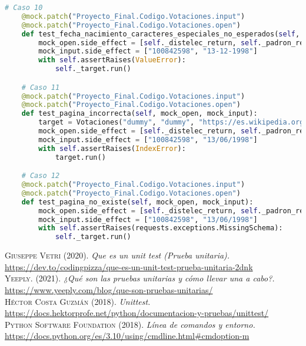 \documentclass[conference]{IEEEtran}
\begin{document}
\begin{lstlisting}[language=Python, basicstyle=\tiny, breaklines=true,
    postbreak=\mbox{\textcolor{red}{$\hookrightarrow$}\space}]
    # Caso 10
    @mock.patch("Proyecto_Final.Codigo.Votaciones.input")
    @mock.patch("Proyecto_Final.Codigo.Votaciones.open")
    def test_fecha_nacimiento_caracteres_especiales_no_esperados(self, mock_open, mock_input):
        mock_open.side_effect = [self._distelec_return, self._padron_return]
        mock_input.side_effect = ["100842598", "13-12-1998"]
        with self.assertRaises(ValueError):
            self._target.run()

    # Caso 11
    @mock.patch("Proyecto_Final.Codigo.Votaciones.input")
    @mock.patch("Proyecto_Final.Codigo.Votaciones.open")
    def test_pagina_incorrecta(self, mock_open, mock_input):
        target = Votaciones("dummy", "dummy", "https://es.wikipedia.org/wiki/Elecciones_generales_de_Costa_Rica_de_3022")
        mock_open.side_effect = [self._distelec_return, self._padron_return]
        mock_input.side_effect = ["100842598", "13/06/1998"]
        with self.assertRaises(IndexError):
            target.run()

    # Caso 12
    @mock.patch("Proyecto_Final.Codigo.Votaciones.input")
    @mock.patch("Proyecto_Final.Codigo.Votaciones.open")
    def test_pagina_no_existe(self, mock_open, mock_input):
        mock_open.side_effect = [self._distelec_return, self._padron_return]
        mock_input.side_effect = ["100842598", "13/06/1998"]
        with self.assertRaises(requests.exceptions.MissingSchema):
            self._target.run()

\end{lstlisting}







\normalsize

\begin{thebibliography}{}


 \textsc{Giuseppe Vetri} (2020). \textit{Que es un unit test (Prueba unitaria).} \url{https://dev.to/codingpizza/que-es-un-unit-test-prueba-unitaria-2dnk}\\

 \textsc{Yeeply.} (2021). \textit{¿Qué son las pruebas unitarias y cómo llevar una a cabo?.} \url{https://www.yeeply.com/blog/que-son-pruebas-unitarias/} \\

 \textsc{Héctor Costa Guzmán} (2018). \textit{Unittest.} \url{https://docs.hektorprofe.net/python/documentacion-y-pruebas/unittest/} \\

 \textsc{Python Software Foundation} (2018). \textit{Línea de comandos y entorno.} \url{https://docs.python.org/es/3.10/using/cmdline.html#cmdoption-m} \\



\end{thebibliography}
\end{document}
